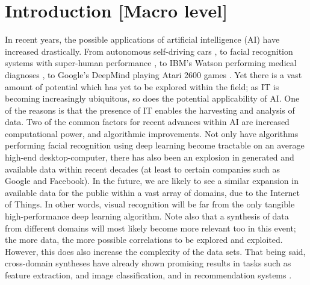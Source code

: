 
\chapter{Introduction [Macro level]}\label{chpt:intro}

In recent years, the possible applications of artificial intelligence (AI) have increased drastically. From autonomous self-driving cars \citep{Urmson2009}, to facial recognition systems with super-human performance \citep{Sun2014}, to IBM's Watson performing medical diagnoses \citep{Wagle2013}, to Google's DeepMind playing Atari 2600 games \citep{Mnih2015}. Yet there is a vast amount of potential which has yet to be explored within the field; as IT is becoming increasingly ubiquitous, so does the potential applicability of AI. One of the reasons is that the presence of IT enables the harvesting and analysis of data. Two of the common factors for recent advances within AI are increased computational power, and algorithmic improvements. Not only have algorithms performing facial recognition using deep learning become tractable on an average high-end desktop-computer, there has also been an explosion in generated and available data within recent decades (at least to certain companies such as Google and Facebook). In the future, we are likely to see a similar expansion in available data for the public within a vast array of domains, due to the Internet of Things. In other words, visual recognition will be far from the only tangible high-performance deep learning algorithm. 
Note also that a synthesis of data from different domains will most likely become more relevant too in this event; the more data, the more possible correlations to be explored and exploited. However, this does also increase the complexity of the data sets. That being said, cross-domain syntheses have already shown promising results in tasks such as feature extraction, and image classification, and in recommendation systems \citep{Huang2013, Shapira2013}.
\\


